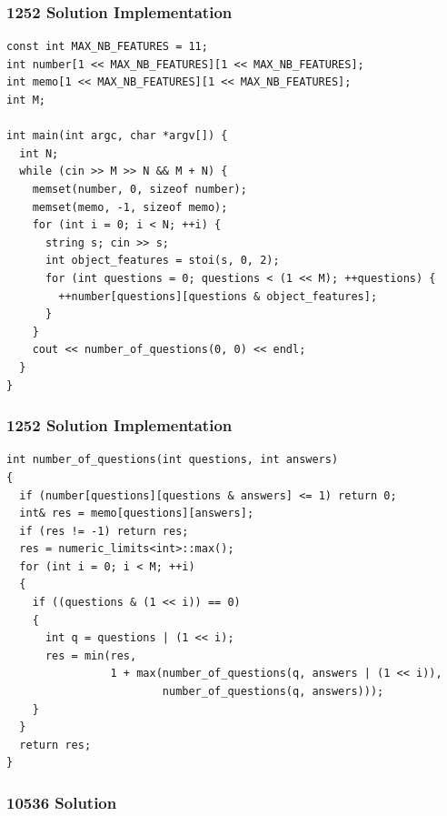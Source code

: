 \documentclass{beamer}
\newcommand{\uvalink}[2]{UVa Online Judge (http://uva.onlinejudge.org)
  problem number \href{#2}{\textcolor{blue}{#1}.}}
\newcounter{exo}
\newcommand{\exo}{
  \addtocounter{exo}{1}
  Exercice \arabic{exo}
}
\begin{document}
\begin{frame}[fragile]
\frametitle{1252 Solution Implementation}

\scriptsize
\begin{lstlisting}
const int MAX_NB_FEATURES = 11;
int number[1 << MAX_NB_FEATURES][1 << MAX_NB_FEATURES];
int memo[1 << MAX_NB_FEATURES][1 << MAX_NB_FEATURES];
int M;

int main(int argc, char *argv[]) {
  int N;
  while (cin >> M >> N && M + N) {
    memset(number, 0, sizeof number);
    memset(memo, -1, sizeof memo);
    for (int i = 0; i < N; ++i) {
      string s;	cin >> s;
      int object_features = stoi(s, 0, 2);
      for (int questions = 0; questions < (1 << M); ++questions) {
        ++number[questions][questions & object_features];
      }
    }
    cout << number_of_questions(0, 0) << endl;
  }
}
\end{lstlisting}

\end{frame}

\begin{frame}[fragile]
\frametitle{1252 Solution Implementation}

\scriptsize
\begin{lstlisting}
int number_of_questions(int questions, int answers)
{
  if (number[questions][questions & answers] <= 1) return 0;
  int& res = memo[questions][answers];
  if (res != -1) return res;
  res = numeric_limits<int>::max();
  for (int i = 0; i < M; ++i)
  {
    if ((questions & (1 << i)) == 0)
    {
      int q = questions | (1 << i);
      res = min(res,
                1 + max(number_of_questions(q, answers | (1 << i)),
                        number_of_questions(q, answers)));
    }
  }
  return res;
}
\end{lstlisting}

\end{frame}

\fi


\ifanswers

\begin{frame}%
\frametitle{10536 Solution}

\end{frame}
\end{document}
